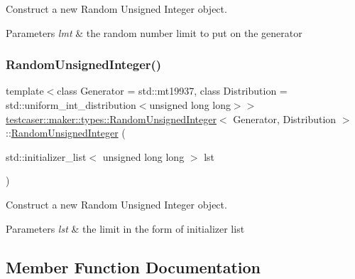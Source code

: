 Construct a new Random Unsigned Integer object. 


\begin{DoxyParams}{Parameters}
{\em lmt} & the random number limit to put on the generator \\
\hline
\end{DoxyParams}
\mbox{\label{classtestcaser_1_1maker_1_1types_1_1RandomUnsignedInteger_a485a3c55c963dbfd1fca8b62214f78ad}} 
\subsubsection{\texorpdfstring{RandomUnsignedInteger()}{RandomUnsignedInteger()}\hspace{0.1cm}{\footnotesize\ttfamily [3/3]}}
{\footnotesize\ttfamily template$<$class Generator = std\+::mt19937, class Distribution = std\+::uniform\+\_\+int\+\_\+distribution$<$unsigned long long$>$$>$ \\
\mbox{\hyperlink{classtestcaser_1_1maker_1_1types_1_1RandomUnsignedInteger}{testcaser\+::maker\+::types\+::\+Random\+Unsigned\+Integer}}$<$ Generator, Distribution $>$\+::\mbox{\hyperlink{classtestcaser_1_1maker_1_1types_1_1RandomUnsignedInteger}{Random\+Unsigned\+Integer}} (\begin{DoxyParamCaption}\item[{std\+::initializer\+\_\+list$<$ unsigned long long $>$}]{lst }\end{DoxyParamCaption})\hspace{0.3cm}{\ttfamily [inline]}}



Construct a new Random Unsigned Integer object. 


\begin{DoxyParams}{Parameters}
{\em lst} & the limit in the form of initializer list \\
\hline
\end{DoxyParams}


\subsection{Member Function Documentation}
\mbox{\label{classtestcaser_1_1maker_1_1types_1_1RandomUnsignedInteger_a73504939f740445d56b0bd00257f5480}} 
